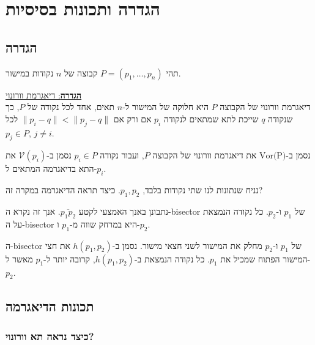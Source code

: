 \documentclass[
]{book}
\begin{document}
\hypertarget{ux5d4ux5d2ux5d3ux5e8ux5d4-ux5d5ux5eaux5dbux5d5ux5e0ux5d5ux5ea-ux5d1ux5e1ux5d9ux5e1ux5d9ux5d5ux5ea}{%
\section{הגדרה ותכונות בסיסיות}\label{ux5d4ux5d2ux5d3ux5e8ux5d4-ux5d5ux5eaux5dbux5d5ux5e0ux5d5ux5ea-ux5d1ux5e1ux5d9ux5e1ux5d9ux5d5ux5ea}}

\hypertarget{ux5d4ux5d2ux5d3ux5e8ux5d4}{%
\subsection{הגדרה}\label{ux5d4ux5d2ux5d3ux5e8ux5d4}}

תהי \(P=(p_1,\dots,p_n)\) קבוצה של \(n\) נקודות במישור.

\ul{\textbf{הגדרה}: דיאגרמת וורונוי}\\
דיאגרמת וורונוי של הקבוצה \(P\) היא חלוקה של המישור ל-\(n\) תאים, אחד לכל נקודה של \(P\), כך שנקודה \(q\) שייכת לתא שמתאים לנקודה \(p_i\) אם ורק אם \(\|p_i-q\|<\|p_j-q\|\) לכל \(p_j\in P\), \(j\neq i\).

נסמן ב-\(\text{Vor(P)}\) את דיאגרמת וורונוי של הקבוצה \(P\), ועבור נקודה \(p_i\in P\) נסמן ב-\(\mathcal{V}(p_i)\) את התא בדיאגרמה המתאים ל-\(p_i\).

נניח שנתונות לנו שתי נקודות בלבד, \(p_1,p_2\). כיצד תראה הדיאגרמה במקרה זה?

נתבונן באנך האמצעי לקטע \(\overline{p_1p_2}\). אנך זה נקרא ה-bisector של \(p_1\) ו-\(p_2\). כל נקודה הנמצאת על ה-bisector היא במרחק שווה מ-\(p_1\) ו-\(p_2\).

ה-bisector של \(p_1\) ו-\(p_2\) מחלק את המישור לשני חצאי מישור. נסמן ב-\(h(p_1,p_2)\) את חצי המישור הפתוח שמכיל את \(p_1\). כל נקודה הנמצאת ב-\(h(p_1,p_2)\), קרובה יותר ל-\(p_1\) מאשר ל-\(p_2\).

\hypertarget{ux5eaux5dbux5d5ux5e0ux5d5ux5ea-ux5d4ux5d3ux5d9ux5d0ux5d2ux5e8ux5deux5d4}{%
\subsection{תכונות הדיאגרמה}\label{ux5eaux5dbux5d5ux5e0ux5d5ux5ea-ux5d4ux5d3ux5d9ux5d0ux5d2ux5e8ux5deux5d4}}

\hypertarget{ux5dbux5d9ux5e6ux5d3-ux5e0ux5e8ux5d0ux5d4-ux5eaux5d0-ux5d5ux5d5ux5e8ux5d5ux5e0ux5d5ux5d9}{%
\subsubsection*{כיצד נראה תא וורונוי?}\label{ux5dbux5d9ux5e6ux5d3-ux5e0ux5e8ux5d0ux5d4-ux5eaux5d0-ux5d5ux5d5ux5e8ux5d5ux5e0ux5d5ux5d9}}
\end{document}
